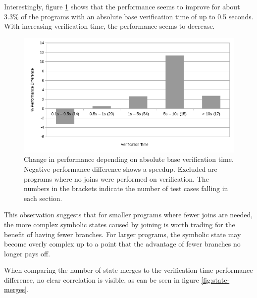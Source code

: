 \documentclass[11pt]{article}
\begin{document}
    Interestingly, figure \ref{fig:absolute-verification-time} shows that the performance seems to
    improve for about 3.3\% of the programs
    with an absolute base verification time of up to 0.5 seconds. With increasing verification
    time, the performance seems to decrease.

    \begin{figure}[H]
        \includegraphics[width=\linewidth]{performance-change-vs-verification-time-part-2-no-warnings-counted.png}
        \caption{
            Change in performance depending on absolute base verification time.
            Negative performance difference shows a speedup.
            Excluded are programs where no joins were performed on verification.
            The numbers in the brackets indicate the number of test cases falling in each section.
        }
        \label{fig:absolute-verification-time}
    \end{figure}
       
    This observation suggests that for smaller programs where fewer joins are needed, the more complex symbolic
    states caused by joining is worth trading for the benefit of having fewer branches. For
    larger programs, the symbolic state may become overly complex up to a point that the advantage of
    fewer branches no longer pays off.

    When comparing the number of state merges 
    to the verification time performance difference, no clear correlation is
    visible, as can be seen in figure \ref{fig:state-merges}.
\end{document}

